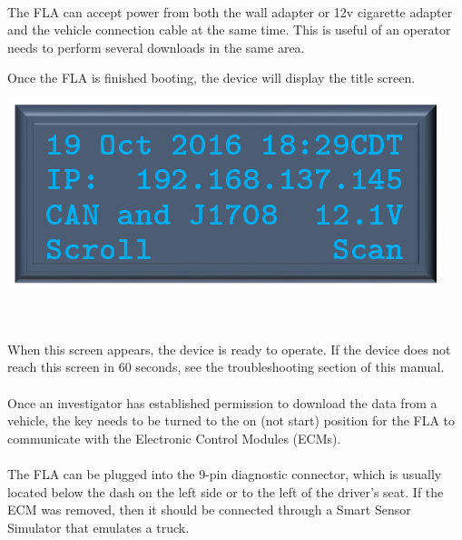 \documentclass[11pt, oneside]{book}
\begin{document}
\paragraph{  }
The FLA can accept power from both the wall adapter or 12v cigarette adapter and the vehicle connection cable at the same time. This is useful of an operator needs to perform several downloads in the same area.
\\[\baselineskip]
\noindent\begin{minipage}{0.45\textwidth}%
	Once the FLA is finished booting, the device will display the title screen.
\end{minipage}%
\hfill%
\begin{minipage}{0.45\textwidth} 
	\includegraphics[width=\linewidth]{../media/pstricks_files/01_main_screen}
\end{minipage}\\[\baselineskip]
\paragraph{  }
When this screen appears, the device is ready to operate. If the device does not reach this screen in 60 seconds, see the troubleshooting section of this manual.
\paragraph{  }
Once an investigator has established permission to download the data from a vehicle, the key needs to be turned to the on (not start) position for the FLA to communicate with the Electronic Control Modules (ECMs).
\paragraph{  }
The FLA can be plugged into the 9-pin diagnostic connector, which is usually located below the dash on the left side or to the left of the driver's seat. If the ECM was removed, then it should be connected through a Smart Sensor Simulator that emulates a truck. 
\end{document}
